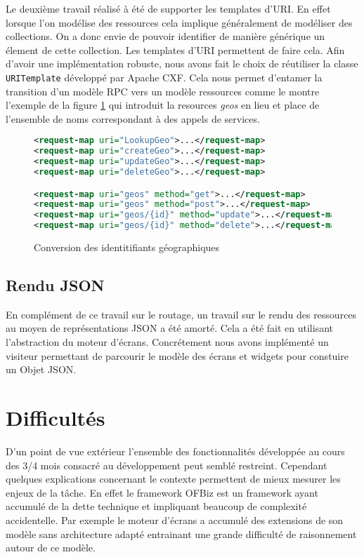 \documentclass[a4paper, 11pt]{report}
\begin{document}
Le deuxième travail réalisé à été de supporter les templates d'URI.
En effet lorsque l'on modélise des ressources cela implique
généralement de modéliser des collections.  On a donc envie de pouvoir
identifier de manière générique un élement de cette collection.  Les
templates d'URI permettent de faire cela.  Afin d'avoir une
implémentation robuste, nous avons fait le choix de réutiliser la
classe \verb=URITemplate= développé par Apache CXF.  Cela nous permet
d'entamer la transition d'un modèle RPC vers un modèle ressources
comme le montre l'exemple de la figure \ref{fig:urit} qui introduit la
resources \emph{geos} en lieu et place de l'ensemble de noms
correspondant à des appels de services.

\begin{figure}
  \begin{lstlisting}[language=xml]
<request-map uri="LookupGeo">...</request-map>
<request-map uri="createGeo">...</request-map>
<request-map uri="updateGeo">...</request-map>
<request-map uri="deleteGeo">...</request-map>

<request-map uri="geos" method="get">...</request-map>
<request-map uri="geos" method="post">...</request-map>
<request-map uri="geos/{id}" method="update">...</request-map>
<request-map uri="geos/{id}" method="delete">...</request-map>
  \end{lstlisting}
\caption{Conversion des identitifiants géographiques}
\label{fig:urit}
\end{figure}

\subsection{Rendu JSON}

En complément de ce travail sur le routage, un travail sur le rendu
des ressources au moyen de représentations JSON a été amorté.  Cela a
été fait en utilisant l'abstraction du moteur d'écrans.  Concrétement
nous avons implémenté un visiteur \cite{gamma1993design} permettant de
parcourir le modèle des écrans et widgets pour constuire un Objet
JSON.

\section{Difficultés}

D'un point de vue extérieur l'ensemble des fonctionnalités développée
au cours des 3/4 mois consacré au développement peut semblé restreint.
Cependant quelques explications concernant le contexte permettent de
mieux mesurer les enjeux de la tâche.  En effet le framework OFBiz est
un framework ayant accumulé de la dette technique et impliquant
beaucoup de complexité accidentelle. Par exemple le moteur d'écrans a
accumulé des extensions de son modèle sans architecture adapté
entrainant une grande difficulté de raisonnement autour de ce modèle.
\end{document}
